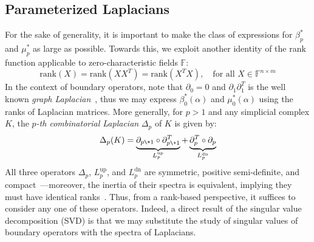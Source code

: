 \subsection{Parameterized Laplacians}\label{sec:laplacian_theory2}
 For the sake of generality, it is important to make the class of expressions for $\beta_p^\ast$ and $\mu_p^\ast$ as large as possible.
Towards this, we exploit another identity of the rank function applicable to zero-characteristic fields $\mathbb{F}$:
$$\mathrm{rank}(X) = \mathrm{rank}(X X^T) = \mathrm{rank}(X^T X), \quad \text{for all } X \in \mathbb{F}^{n \times m}$$ 
In the context of boundary operators, note that $\partial_0 = 0$ and $\partial_1 \partial_1^T$ is the well known \emph{graph Laplacian}~\cite{chung1997spectral}, thus we may express $\beta_0^\ast(\alpha)$ and $\mu_0^\ast(\alpha)$ using the ranks of Laplacian matrices. 
More generally, for $p > 1$ and any simplicial complex $K$, the \emph{$p$-th combinatorial Laplacian} $\Delta_p$ of $K$ is given by: 
\begin{equation}\label{eq:comb_lap}
	\Delta_p(K) = \underbrace{\partial_{p\+1} \circ \partial_{p\+1}^T}_{L_p^{\text{up}}} + \underbrace{\partial_{p}^T  \circ  \partial_{p}}_{L_p^{\text{dn}}} 
\end{equation}
\noindent 
All three operators $\Delta_p$, $L_p^{\text{up}}$, and $L_p^{\text{dn}}$ are symmetric, positive semi-definite, and compact~\cite{memoli2022persistent}---moreover, the inertia of their spectra is equivalent, implying they must have identical ranks~\cite{horak2013spectra}. Thus, from a rank-based perspective, it suffices to consider any one of these operators.
Indeed, a direct result of the singular value decomposition (SVD) is that we may substitute the study of singular values of boundary operators with the spectra of Laplacians.  



